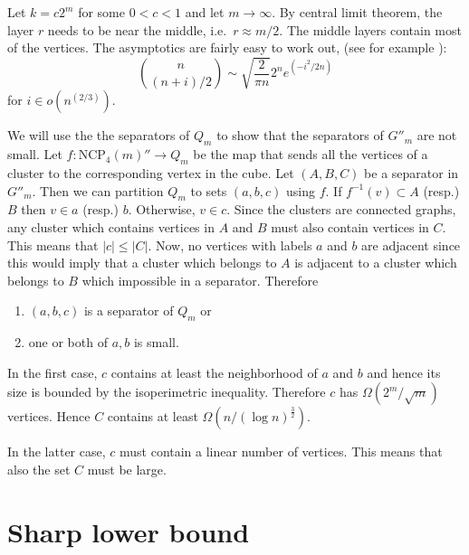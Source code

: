 \documentclass[a4paper,12pt]{book}
\theoremstyle{plain}
\theoremstyle{definition}
\newcommand\NC{\textrm{NCP}}
\begin{document}
Let $k = c2^m$ for some $0<c<1$ and let $m \rightarrow \infty$. By central limit theorem, 
the layer $r$ needs to be near the middle, i.e.\ $r\approx m/2$. The middle layers contain most of the vertices.
The asymptotics are fairly easy to work out, (see for example \cite{Spencer:Asymptopia}):
\begin{equation}
\binom{n}{(n+i)/2} \sim \sqrt{\frac{2}{\pi n}} 2^n e^{\left(-i^2/2n\right)}  
\end{equation}
for $i \in o(n^{(2/3)})$.


We will use the the separators of $Q_m$ to show that the separators of $G''_m$ are not small.
Let $f: \NC_4(m)'' \rightarrow Q_m$ 
be the map that sends all the vertices of a cluster to the corresponding vertex 
in the cube. 
Let $(A,B,C)$ be a separator in $G''_m$. Then we can partition
$Q_m$ to sets $(a,b,c)$ using $f$. If $f^{-1}(v) \subset A$ (resp.) $B$ 
then 
$v \in a$ (resp.) $b$. Otherwise, $v \in c$. Since the clusters are connected 
graphs, any cluster which contains vertices in $A$ and $B$ must also contain 
vertices in $C$. This means that $|c| \leq |C|$.
Now, no vertices with labels $a$ and $b$ are adjacent since this would imply 
that a cluster which belongs to $A$ is adjacent to a cluster which belongs to 
$B$ which impossible in a separator. Therefore
\begin{enumerate}
 \item $(a,b,c)$ is a separator of $Q_m$ or
\item one or both of $a,b$ is small.
\end{enumerate}
In the first case, $c$ contains at least the neighborhood of $a$ and $b$ and 
hence its size is bounded by the isoperimetric inequality. Therefore $c$ has 
$\Omega(2^m/\sqrt{m})$ vertices. Hence $C$ contains at least $\Omega(n/(\log 
n)^{\frac{3}{2}})$.

In the latter case, $c$ must contain a linear number of vertices. This means 
that also the set $C$ must be large.  

\section{Sharp lower bound}
\end{document}
